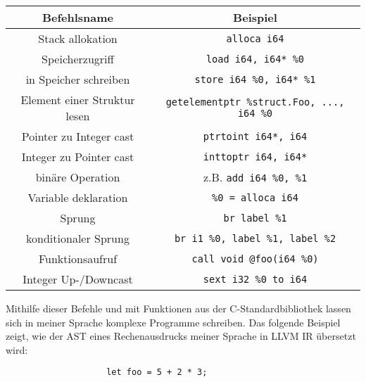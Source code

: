         \begin{center}
            \begin{tabular}{|c|c|}
                \hline
                Befehlsname & Beispiel \\
                \hline
                Stack allokation & \texttt{alloca i64} \\
                Speicherzugriff & \texttt{load i64, i64* \%0} \\
                in Speicher schreiben & \texttt{store i64 \%0, i64* \%1} \\
                Element einer Struktur lesen & \texttt{getelementptr \%struct.Foo, ..., i64 \%0} \\
                Pointer zu Integer cast & \texttt{ptrtoint i64*, i64} \\
                Integer zu Pointer cast & \texttt{inttoptr i64, i64*} \\
                binäre Operation & z.B. \texttt{add i64 \%0, \%1} \\
                Variable deklaration & \texttt{\%0 = alloca i64} \\
                Sprung & \texttt{br label \%1} \\
                konditionaler Sprung & \texttt{br i1 \%0, label \%1, label \%2} \\
                Funktionsaufruf & \texttt{call void @foo(i64 \%0)} \\
                Integer Up-/Downcast& \texttt{sext i32 \%0 to i64} \\
                \hline

            \end{tabular}
        \end{center}
        Mithilfe dieser Befehle und mit Funktionen aus der C-Standardbibliothek lassen sich in meiner Sprache
        komplexe Programme schreiben.
        \newpage
        Das folgende Beispiel zeigt, wie der AST eines Rechenausdrucks meiner Sprache in LLVM IR übersetzt wird:

        \begin{center}
            \begin {lstlisting}
                    let foo = 5 + 2 * 3;
            \end{lstlisting}
        \end{center}

